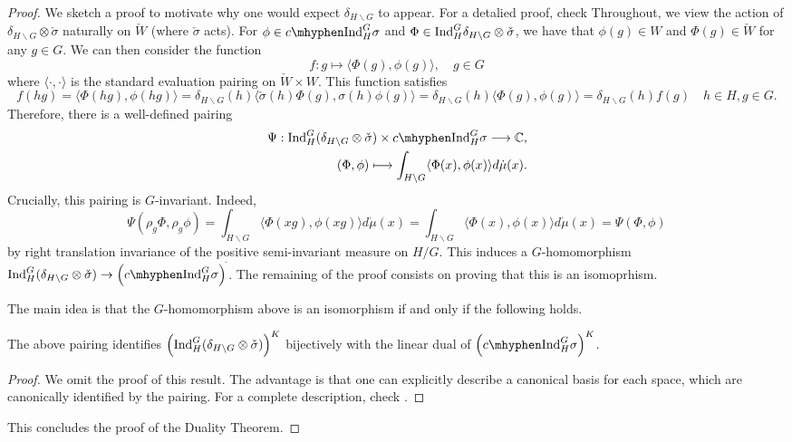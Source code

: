 \begin{proof}
    We sketch a proof to motivate why one would expect $\delta_{H\backslash G}$ to appear. For a detalied proof, check \cite[]{BH1}
    Throughout, we view the action of $\delta_{H\backslash G}\otimes\check{\sigma}$ naturally on $\check{W}$ (where $\check{\sigma}$ acts). For $\phi\in \cInd_H^G\sigma$ and $\Phi\in\mathrm{Ind}_H^G\delta_{H\backslash G}\otimes\check{\sigma}$, 
    we have that $\phi(g)\in W$ and $\Phi(g)\in\check{W}$ for any $g\in G$. We can then consider the function $$f:g\longmapsto\langle\Phi(g),\phi(g)\rangle,\quad g\in G $$ 
    where $\langle\cdot,\cdot\rangle$ is the standard evaluation pairing on $\check{W}\times W$. This function satisfies 
    $$f(hg)=\langle\Phi(hg),\phi(hg)\rangle=\delta_{H\backslash G}(h)\langle\check{\sigma}(h)\Phi(g),\sigma(h)\phi(g)\rangle=\delta_{H\backslash G}(h)\langle\Phi(g),\phi(g)\rangle=\delta_{H\backslash G}(h)f(g)\quad h\in H, g\in G.$$
    Therefore, there is a well-defined pairing 
    \begin{align*}
        \Psi:\Ind_H^G(\delta_{H\backslash G}\otimes\check{\sigma})\times \cInd_H^G\sigma\longrightarrow\CC&,\\
        (\Phi,\phi)\longmapsto\int_{H\backslash G}\langle\Phi(x),\phi(x)\rangle d\dot{\mu}(x)&.
    \end{align*}
    Crucially, this pairing is $G$-invariant. Indeed, 
    $$\Psi(\rho_g\Phi,\rho_g\phi)=\int_{H\backslash G}\langle\Phi(xg),\phi(xg)\rangle d\dot{\mu}(x)=\int_{H\backslash G}\langle\Phi(x),\phi(x)\rangle d\dot{\mu}(x)=\Psi(\Phi,\phi)$$
    by right translation invariance of the positive semi-invariant measure on $H/G$. 
    This induces a $G$-homomorphism $\Ind_H^G(\delta_{H\backslash G}\otimes \check{\sigma})\to \left(\cInd_H^G\sigma \right)^{\check{}}$. The remaining of the proof consists on proving that this is an isomoprhism.

    The main idea is that the $G$-homomorphism above is an isomorphism if and only if the following holds.
    \begin{lemma}
        The above pairing identifies $\left(\mathrm{Ind}_H^G(\delta_{H\backslash G}\otimes \check{\sigma})\right)^K$ bijectively with the linear dual of $\left(\cInd_H^G\sigma \right)^K$.
    \end{lemma}
    \begin{proof}
        We omit the proof of this result. The advantage is that one can explicitly describe a canonical basis for each space, which are canonically identified by the pairing. For a complete description, check \cite[3.5 Lemma 2]{BH1}.
    \end{proof}
    This concludes the proof of the Duality Theorem.
\end{proof}